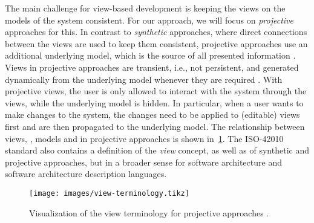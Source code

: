 The main challenge for view-based development is keeping the views on the models of the system consistent.
For our approach, we will focus on \emph{projective} approaches for this.
In contrast to \emph{synthetic} approaches, where direct connections between the views are used to keep them consistent, projective approaches use an additional underlying model, which is the source of all presented information \cite{atkinson_fundamental_2015}.
Views in projective approaches are transient, i.e., not persistent, and generated dynamically from the underlying model whenever they are required \cite{atkinson_orthographic_2010}.
With projective views, the user is only allowed to interact with the system through the views, while the underlying model is hidden.
In particular, when a user wants to make changes to the system, the changes need to be applied to (editable) views first and are then propagated to the underlying model.
The relationship between views, \viewtypes, models and \metamodels in projective approaches is shown in~\cref{fig:view_concept}.
The ISO-42010 standard \cite{ISO42010} also contains a definition of the \emph{view} concept, as well as of synthetic and projective approaches, but in a broader sense for software architecture and software architecture description languages.

\begin{comment}
There exist \emph{synthetic} and \emph{projective} approaches to view-based modeling \cite{atkinson_fundamental_2015}.
In the former approaches, the system is represented by the union of all views.
For that purpose, changes must be propagated between the views to ensure the system description is consistent.
This is different in projective approaches where, in addition to the views, an underlying model of the system exists, which is the source of all information.    
\end{comment}

\begin{figure}
    \begin{center}
        \texttt{[image: images/view-terminology.tikz]}
    \end{center}

    \caption{Visualization of the view terminology for projective approaches \cite{klare_enabling_2021}.}
    \label{fig:view_concept}
\end{figure}


